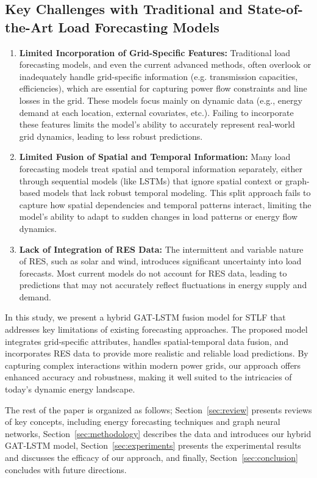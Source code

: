 \documentclass[sigconf,nonacm]{acmart}
\begin{document}
\subsection*{Key Challenges with Traditional and State-of-the-Art Load Forecasting Models}
\begin{enumerate}
    \item \textbf{Limited Incorporation of Grid-Specific Features:} Traditional load forecasting models, and even the current advanced methods, often overlook or inadequately handle grid-specific information (e.g. transmission capacities, efficiencies), which are essential for capturing power flow constraints and line losses in the grid. These models focus mainly on dynamic data (e.g., energy demand at each location, external covariates, etc.). Failing to incorporate these features limits the model’s ability to accurately represent real-world grid dynamics, leading to less robust predictions.
    
    \item \textbf{Limited Fusion of Spatial and Temporal Information:} Many load forecasting models treat spatial and temporal information separately, either through sequential models (like LSTMs) that ignore spatial context or graph-based models that lack robust temporal modeling. This split approach fails to capture how spatial dependencies and temporal patterns interact, limiting the model's ability to adapt to sudden changes in load patterns or energy flow dynamics.
    
    \item \textbf{Lack of Integration of RES Data:} The intermittent and variable nature of RES, such as solar and wind, introduces significant uncertainty into load forecasts. Most current models do not account for RES data, leading to predictions that may not accurately reflect fluctuations in energy supply and demand.
\end{enumerate}

In this study, we present a hybrid GAT-LSTM fusion model for STLF that addresses key limitations of existing forecasting approaches. The proposed model integrates grid-specific attributes, handles spatial-temporal data fusion, and incorporates RES data to provide more realistic and reliable load predictions. By capturing complex interactions within modern power grids, our approach offers enhanced accuracy and robustness, making it well suited to the intricacies of today’s dynamic energy landscape.

The rest of the paper is organized as follows; Section~\ref{sec:review} presents reviews of key concepts, including energy forecasting techniques and graph neural networks, Section~\ref{sec:methodology} describes the data and introduces our hybrid GAT-LSTM model, Section~\ref{sec:experiments} presents the experimental results and discusses the efficacy of our approach, and finally, Section~\ref{sec:conclusion} concludes with future directions.
\end{document}
